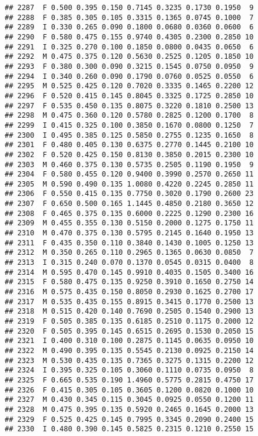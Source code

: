 \documentclass[
]{article}
\begin{document}
\begin{verbatim}
## 2287  F 0.500 0.395 0.150 0.7145 0.3235 0.1730 0.1950  9
## 2288  F 0.385 0.305 0.105 0.3315 0.1365 0.0745 0.1000  7
## 2289  I 0.330 0.265 0.090 0.1800 0.0680 0.0360 0.0600  6
## 2290  F 0.580 0.475 0.155 0.9740 0.4305 0.2300 0.2850 10
## 2291  I 0.325 0.270 0.100 0.1850 0.0800 0.0435 0.0650  6
## 2292  M 0.475 0.375 0.120 0.5630 0.2525 0.1205 0.1850 10
## 2293  F 0.380 0.300 0.090 0.3215 0.1545 0.0750 0.0950  9
## 2294  I 0.340 0.260 0.090 0.1790 0.0760 0.0525 0.0550  6
## 2295  M 0.525 0.425 0.120 0.7020 0.3335 0.1465 0.2200 12
## 2296  F 0.520 0.415 0.145 0.8045 0.3325 0.1725 0.2850 10
## 2297  F 0.535 0.450 0.135 0.8075 0.3220 0.1810 0.2500 13
## 2298  M 0.475 0.360 0.120 0.5780 0.2825 0.1200 0.1700  8
## 2299  I 0.415 0.325 0.100 0.3850 0.1670 0.0800 0.1250  7
## 2300  I 0.495 0.385 0.125 0.5850 0.2755 0.1235 0.1650  8
## 2301  F 0.480 0.405 0.130 0.6375 0.2770 0.1445 0.2100 10
## 2302  F 0.520 0.425 0.150 0.8130 0.3850 0.2015 0.2300 10
## 2303  M 0.460 0.375 0.130 0.5735 0.2505 0.1190 0.1950  9
## 2304  F 0.580 0.455 0.120 0.9400 0.3990 0.2570 0.2650 11
## 2305  M 0.590 0.490 0.135 1.0080 0.4220 0.2245 0.2850 11
## 2306  F 0.550 0.415 0.135 0.7750 0.3020 0.1790 0.2600 23
## 2307  F 0.650 0.500 0.165 1.1445 0.4850 0.2180 0.3650 12
## 2308  F 0.465 0.375 0.135 0.6000 0.2225 0.1290 0.2300 16
## 2309  M 0.455 0.355 0.130 0.5150 0.2000 0.1275 0.1750 11
## 2310  M 0.470 0.375 0.130 0.5795 0.2145 0.1640 0.1950 13
## 2311  F 0.435 0.350 0.110 0.3840 0.1430 0.1005 0.1250 13
## 2312  M 0.350 0.265 0.110 0.2965 0.1365 0.0630 0.0850  7
## 2313  I 0.315 0.240 0.070 0.1370 0.0545 0.0315 0.0400  8
## 2314  M 0.595 0.470 0.145 0.9910 0.4035 0.1505 0.3400 16
## 2315  F 0.580 0.475 0.135 0.9250 0.3910 0.1650 0.2750 14
## 2316  M 0.575 0.435 0.150 0.8050 0.2930 0.1625 0.2700 17
## 2317  M 0.535 0.435 0.155 0.8915 0.3415 0.1770 0.2500 13
## 2318  M 0.515 0.420 0.140 0.7690 0.2505 0.1540 0.2900 13
## 2319  F 0.505 0.385 0.135 0.6185 0.2510 0.1175 0.2000 12
## 2320  F 0.505 0.395 0.145 0.6515 0.2695 0.1530 0.2050 15
## 2321  I 0.400 0.310 0.100 0.2875 0.1145 0.0635 0.0950 10
## 2322  M 0.490 0.395 0.135 0.5545 0.2130 0.0925 0.2150 14
## 2323  M 0.530 0.435 0.135 0.7365 0.3275 0.1315 0.2200 12
## 2324  I 0.395 0.325 0.105 0.3060 0.1110 0.0735 0.0950  8
## 2325  F 0.665 0.535 0.190 1.4960 0.5775 0.2815 0.4750 17
## 2326  F 0.415 0.305 0.105 0.3605 0.1200 0.0820 0.1000 10
## 2327  M 0.430 0.345 0.115 0.3045 0.0925 0.0550 0.1200 11
## 2328  M 0.475 0.395 0.135 0.5920 0.2465 0.1645 0.2000 13
## 2329  F 0.525 0.425 0.145 0.7995 0.3345 0.2090 0.2400 15
## 2330  I 0.480 0.390 0.145 0.5825 0.2315 0.1210 0.2550 15

\end{verbatim}
\end{document}
